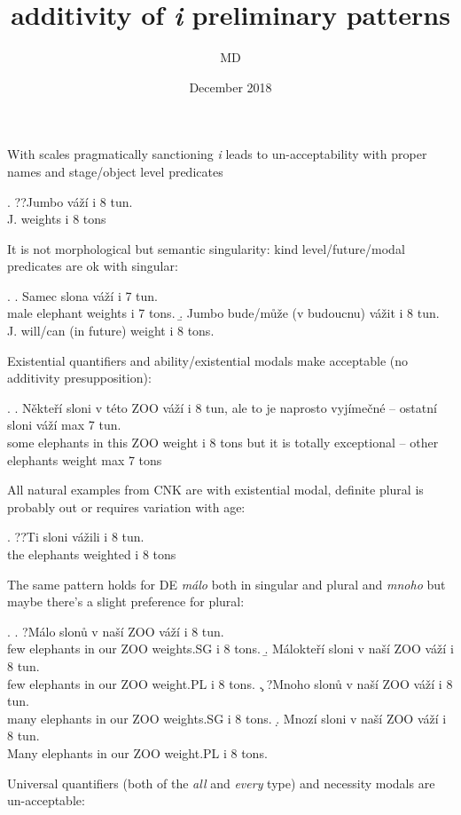 \documentclass{article}
\title{additivity of \textit{i} preliminary patterns}
\author{MD}
\date{December 2018}
\begin{document}
\maketitle

With scales pragmatically sanctioning \textit{i} leads to un-acceptability with proper names and stage/object level predicates

\ex. ??Jumbo váží i 8 tun.\\
J. weights i 8 tons

It is not morphological but semantic singularity: kind level/future/modal predicates are ok with singular:

\ex. \a. Samec slona váží i 7 tun.\\
male elephant weights i 7 tons.
\b. Jumbo bude/může (v budoucnu) vážit i 8 tun.\\
J. will/can (in future) weight i 8 tons.

Existential quantifiers and ability/existential modals make \LLast acceptable (no additivity presupposition):

\ex. \a. Někteří sloni v této ZOO váží i 8 tun, ale to je naprosto vyjímečné -- ostatní sloni váží max 7 tun.\\
some elephants in this ZOO weight i 8 tons but it is totally exceptional -- other elephants weight max 7 tons

All natural examples from CNK are with existential modal, definite plural is probably out or requires variation with age:

\ex. ??Ti sloni vážili i 8 tun.\\
the elephants weighted i 8 tons

The same pattern holds for DE \textit{málo} both in singular and plural and \textit{mnoho} but maybe there's a slight preference for plural:

\ex. \a. ?Málo slonů v naší ZOO váží i 8 tun.\\
few elephants in our ZOO weights.SG i 8 tons.
\b. Málokteří sloni v naší ZOO váží i 8 tun.\\
few elephants in our ZOO weight.PL i 8 tons.
\c. ?Mnoho slonů v naší ZOO váží i 8 tun.\\
many elephants in our ZOO weights.SG i 8 tons.
\d. Mnozí sloni v naší ZOO váží i 8 tun.\\
Many elephants in our ZOO weight.PL i 8 tons.

Universal quantifiers (both of the \textit{all} and \textit{every} type) and necessity modals are un-acceptable:
\end{document}
